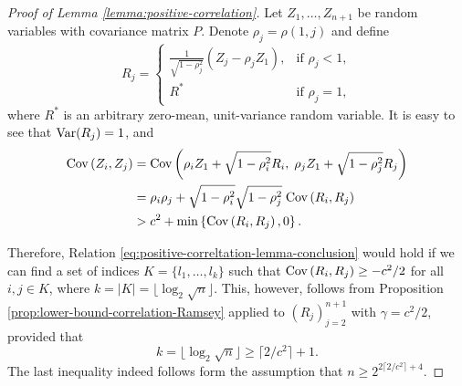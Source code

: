 \begin{proof}[Proof of Lemma \ref{lemma:positive-correlation}]
    Let $Z_1, \ldots, Z_{n+1}$ be random variables with covariance matrix $P$.
    Denote $\rho_j = \rho(1,j)$ and define 
    \begin{equation}
      R_j = 
      \begin{cases}
        \frac{1}{\sqrt{1-\rho_j^2}}\left(Z_j - \rho_j Z_1\right), &\mbox{if } \rho_j<1,\\
        R^* &\mbox{if } \rho_j=1,
      \end{cases}
    \end{equation}
    where $R^*$ is an arbitrary zero-mean, unit-variance random variable.
    It is easy to see that ${\rm {Var}}(R_j) = 1$, and
    \begin{align*}
    {\rm {Cov}}\left(Z_i, Z_j\right) &= {\rm {Cov}}\left(\rho_i Z_1 + \sqrt{1-\rho_i^2} R_i, \; \rho_j Z_1 + \sqrt{1-\rho_j^2} R_j\right) \\
        &= \rho_i\rho_j + \sqrt{1-\rho_i^2}\sqrt{1-\rho_j^2} \;{\rm {Cov}}\left(R_i, R_j\right) \\
        &> c^2 + \min\left\{{\rm {Cov}}\left(R_i, R_j\right), 0\right\}.
    \end{align*}
    
    Therefore, Relation \eqref{eq:positive-correltation-lemma-conclusion} would hold if we can find a set of indices $K = \{l_1,\ldots,l_k\}$ such that ${\rm {Cov}}\left(R_i,R_j\right)\ge -c^2/2$ for all $i,j\in K$, where $k=|K|=\lfloor\log_2\sqrt{n}\rfloor$.
    This, however, follows from Proposition \ref{prop:lower-bound-correlation-Ramsey} applied to $\left(R_j\right)_{j=2}^{n+1}$ with $\gamma = c^2/2$, provided that 
    $$
    k = \lfloor\log_2\sqrt{n}\rfloor \ge \lceil 2/c^2 \rceil + 1.
    $$
    The last inequality indeed follows form the assumption that $n \ge 2^{2\lceil2/c^2\rceil+4}$.
\end{proof}


